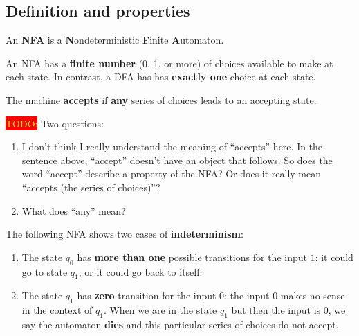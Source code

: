 \documentclass[12pt, letterpaper, oneside]{book}
\begin{document}
\subsection{Definition and properties}

An \textbf{NFA} is a \textbf{N}ondeterministic \textbf{F}inite \textbf{A}utomaton.

An NFA has a \textbf{finite number} (0, 1, or more) of choices available to make at each state. In contrast, a DFA has
has \textbf{exactly one} choice at each state.

The machine \textbf{accepts} if \textbf{any} series of choices leads to an accepting state.

\colorbox{red}{\textcolor{yellow}{TODO:}} Two questions:
\begin{enumerate}
  \item I don't think I really understand the meaning of ``accepts'' here. In the sentence above, ``accept'' doesn't
        have an object that follows. So does the word ``accept'' describe a property of the NFA? Or does it really mean
        ``accepts (the series of choices)''?
  \item What does ``any'' mean?
\end{enumerate}

The following NFA shows two cases of \textbf{indeterminism}:


\begin{enumerate}
  \item The state $q_0$ has \textbf{more than one} possible transitions for the input $1$: it could go to state $q_1$,
        or it could go back to itself.
  \item The state $q_1$ has \textbf{zero} transition for the input $0$: the input $0$ makes no sense in the context of
        $q_1$. When we are in the state $q_1$ but then the input is $0$, we say the automaton \textbf{dies} and this
        particular series of choices do not accept.
\end{enumerate}
\end{document}

